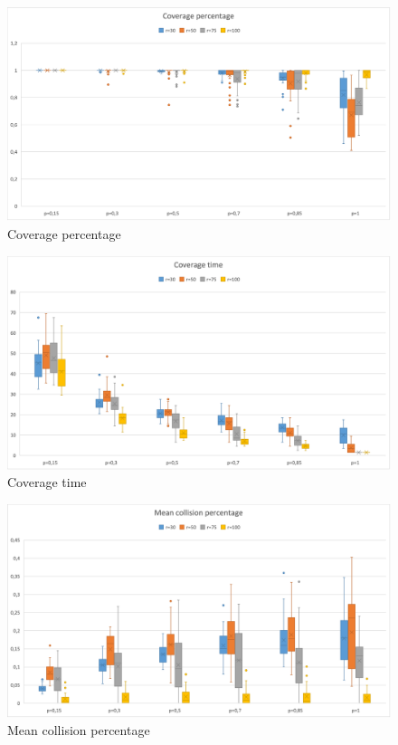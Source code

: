 \begin{figure}[h!]
\centering
    \includegraphics[width= 1\textwidth]{./images/Rate200Boxplot.png}
    \caption{Coverage percentage}
    \label{fig:coverage-percentage}
\end{figure}


\begin{figure}[h!]
\centering
    \includegraphics[width= 1\textwidth]{./images/Time200Boxplot.png}
    \caption{Coverage time}
    \label{fig:coverage-time200}
\end{figure}

\clearpage 

\begin{figure}[h!]
\centering
    \includegraphics[width= 1\textwidth]{./images/Collision200Boxplot.png}
    \caption{Mean collision percentage}
    \label{fig:mean-collision-rate200}
\end{figure}

